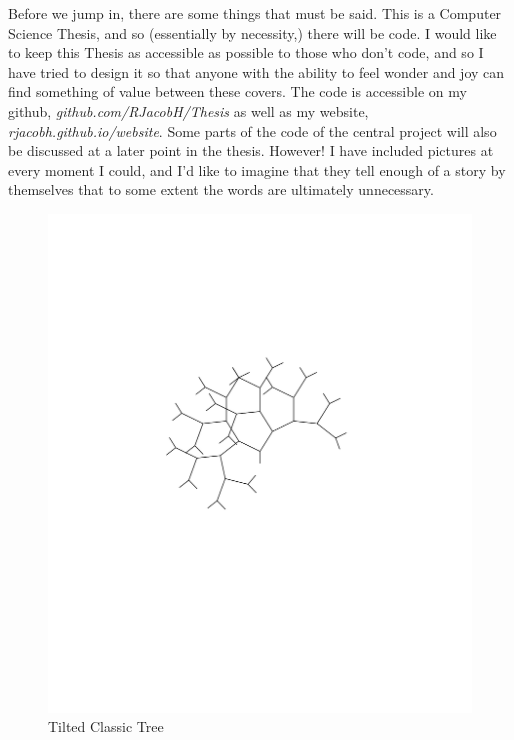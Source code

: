 \documentclass[12pt,twoside]{reedthesis}
\begin{document}
Before we jump in, there are some things that must be said. This is a Computer Science Thesis, and so (essentially by necessity,) there will be code. I would like to keep this Thesis as accessible as possible to those who don’t code, and so I have tried to design it so that anyone with the ability to feel wonder and joy can find something of value between these covers. The code is accessible on my github, \textit{github.com/RJacobH/Thesis} as well as my website, \textit{rjacobh.github.io/website}. Some parts of the code of the central project will also be discussed at a later point in the thesis. However! I have included pictures at every moment I could, and I’d like to imagine that they tell enough of a story by themselves that to some extent the words are ultimately unnecessary.

	\begin{figure}[h]
	\centering
	\includegraphics[clip=true, viewport=2.5in 4.5in 7.5in 8.5in, scale=0.75]{Images/Introduction2} 
	\caption[Tilted Classic Tree]{Tilted Classic Tree\footnotemark}
	\label {Introduction2}
	\end{figure}
\end{document}
